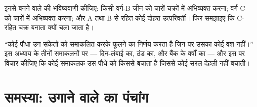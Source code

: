 \begin{exercise}[$\star\star\star$]\label{exo:b2:plant-flowering:11}
इनसे बनने वाले  की भविष्यवाणी कीजिए: किसी वर्ग-B जीन को चारों
चक्रों में अभिव्यक्त करना; वर्ग C को चारों में अभिव्यक्त करना; और A तथा B
से रहित कोई दोहरा उत्परिवर्ती। फिर समझाइए कि C-रहित 
चक्र बनाता क्यों चला जाता है।
\end{exercise}

\begin{exercise}[$\star\star\star$]\label{exo:b2:plant-flowering:12}
``कोई पौधा उन संकेतों को समाकलित करके फूलने का निर्णय करता है जिन पर उसका
कोई वश नहीं।'' इस अध्याय के तीनों समाकलनों पर --- दिन-लंबाई का, ठंड का,
और  बैंक के वर्षों का --- और इस पर विचार कीजिए कि कोई समाकलक उस पौधे
को किससे बचाता है जिससे कोई सरल देहली नहीं बचाती।
\end{exercise}

\section{समस्या: उगाने वाले का पंचांग}

